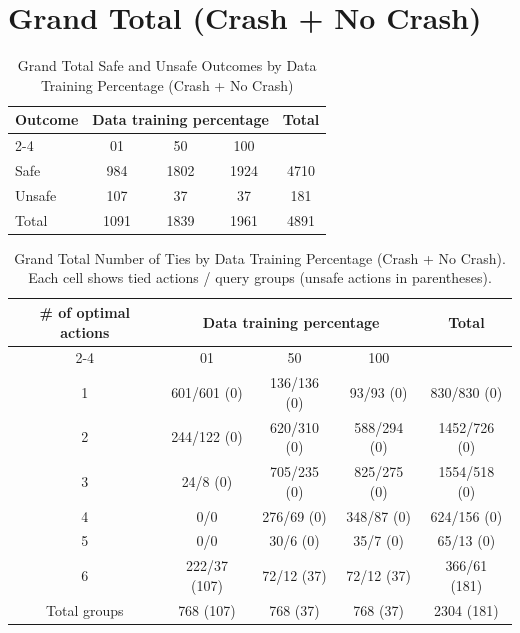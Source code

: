 \documentclass{article}
\begin{document}
\pagebreak
\section{Grand Total (Crash + No Crash)}

\begin{table}[h]
\centering
\caption{Grand Total Safe and Unsafe Outcomes by Data Training Percentage (Crash + No Crash)}
\begin{tabular}{l|ccc|c}
\toprule
\multirow{2}{*}{Outcome} & \multicolumn{3}{c|}{Data training percentage} & \multirow{2}{*}{Total} \\
\cmidrule{2-4}
 & 01 & 50 & 100 & \\
\midrule
Safe & 984 & 1802 & 1924 & 4710 \\ 
Unsafe & 107 & 37 & 37 & 181 \\ 
\midrule
Total & 1091 & 1839 & 1961 & 4891 \\ 
\bottomrule
\end{tabular}
\end{table}

\begin{table}[h]
\centering
\caption{Grand Total Number of Ties by Data Training Percentage (Crash + No Crash).
Each cell shows tied actions / query groups (unsafe actions in parentheses).}
\begin{tabular}{c|ccc|c}
\toprule
\multirow{2}{*}{\# of optimal actions} & \multicolumn{3}{c|}{Data training percentage} & \multirow{2}{*}{Total} \\
\cmidrule{2-4}
 & 01 & 50 & 100 & \\
\midrule
1 & 601/601 (0) & 136/136 (0) & 93/93 (0) & 830/830 (0) \\ 
2 & 244/122 (0) & 620/310 (0) & 588/294 (0) & 1452/726 (0) \\ 
3 & 24/8 (0) & 705/235 (0) & 825/275 (0) & 1554/518 (0) \\ 
4 & 0/0 & 276/69 (0) & 348/87 (0) & 624/156 (0) \\ 
5 & 0/0 & 30/6 (0) & 35/7 (0) & 65/13 (0) \\ 
6 & 222/37 (107) & 72/12 (37) & 72/12 (37) & 366/61 (181) \\ 
\midrule
Total groups & 768 (107) & 768 (37) & 768 (37) & 2304 (181) \\ 
\bottomrule
\end{tabular}
\end{table}
\end{document}
